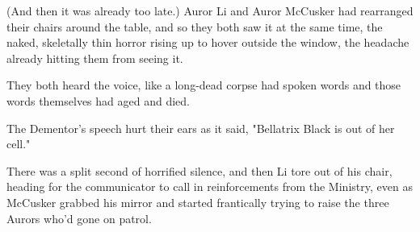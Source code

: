 (And then it was already too late.)
\sbreak
Auror Li and Auror McCusker had rearranged their chairs around the table, and
so they both saw it at the same time, the naked, skeletally thin horror rising
up to hover outside the window, the headache already hitting them from seeing
it.

They both heard the voice, like a long-dead corpse had spoken words and those
words themselves had aged and died.

The Dementor's speech hurt their ears as it said, "Bellatrix Black is out of
her cell."

There was a split second of horrified silence, and then Li tore out of his
chair, heading for the communicator to call in reinforcements from the
Ministry, even as McCusker grabbed his mirror and started frantically trying to
raise the three Aurors who'd gone on patrol.
